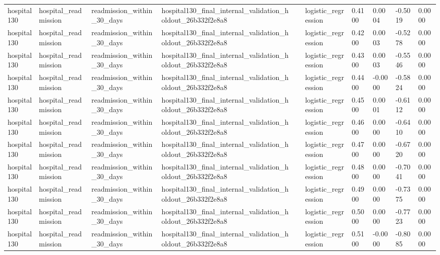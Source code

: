 \begin{tabular}{llllllllll}
hospital130 & hospital\_readmission & readmission\_within\_30\_days & hospital130\_final\_internal\_validation\_holdout\_26b332f2e8a8 &  & logistic\_regression & 0.4100 & 0.0004 & -0.5019 & 0.0000 \\
hospital130 & hospital\_readmission & readmission\_within\_30\_days & hospital130\_final\_internal\_validation\_holdout\_26b332f2e8a8 &  & logistic\_regression & 0.4200 & 0.0003 & -0.5278 & 0.0000 \\
hospital130 & hospital\_readmission & readmission\_within\_30\_days & hospital130\_final\_internal\_validation\_holdout\_26b332f2e8a8 &  & logistic\_regression & 0.4300 & 0.0003 & -0.5546 & 0.0000 \\
hospital130 & hospital\_readmission & readmission\_within\_30\_days & hospital130\_final\_internal\_validation\_holdout\_26b332f2e8a8 &  & logistic\_regression & 0.4400 & -0.0000 & -0.5824 & 0.0000 \\
hospital130 & hospital\_readmission & readmission\_within\_30\_days & hospital130\_final\_internal\_validation\_holdout\_26b332f2e8a8 &  & logistic\_regression & 0.4500 & 0.0001 & -0.6112 & 0.0000 \\
hospital130 & hospital\_readmission & readmission\_within\_30\_days & hospital130\_final\_internal\_validation\_holdout\_26b332f2e8a8 &  & logistic\_regression & 0.4600 & 0.0000 & -0.6410 & 0.0000 \\
hospital130 & hospital\_readmission & readmission\_within\_30\_days & hospital130\_final\_internal\_validation\_holdout\_26b332f2e8a8 &  & logistic\_regression & 0.4700 & 0.0000 & -0.6720 & 0.0000 \\
hospital130 & hospital\_readmission & readmission\_within\_30\_days & hospital130\_final\_internal\_validation\_holdout\_26b332f2e8a8 &  & logistic\_regression & 0.4800 & 0.0000 & -0.7041 & 0.0000 \\
hospital130 & hospital\_readmission & readmission\_within\_30\_days & hospital130\_final\_internal\_validation\_holdout\_26b332f2e8a8 &  & logistic\_regression & 0.4900 & 0.0000 & -0.7375 & 0.0000 \\
hospital130 & hospital\_readmission & readmission\_within\_30\_days & hospital130\_final\_internal\_validation\_holdout\_26b332f2e8a8 &  & logistic\_regression & 0.5000 & 0.0000 & -0.7723 & 0.0000 \\
hospital130 & hospital\_readmission & readmission\_within\_30\_days & hospital130\_final\_internal\_validation\_holdout\_26b332f2e8a8 &  & logistic\_regression & 0.5100 & -0.0000 & -0.8085 & 0.0000 \\

\end{tabular}
